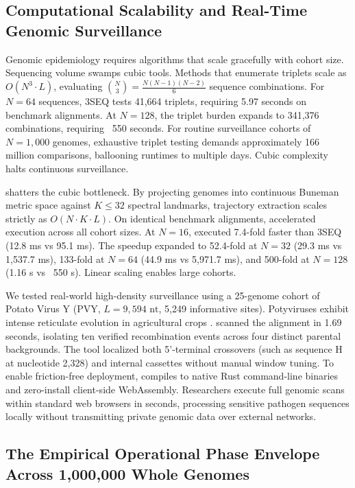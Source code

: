 \subsection{Computational Scalability and Real-Time Genomic Surveillance}
\label{subsec:scalability}

Genomic epidemiology requires algorithms that scale gracefully with cohort size.
Sequencing volume swamps cubic tools.
Methods that enumerate triplets scale as $O(N^3 \cdot L)$, evaluating $\binom{N}{3} = \frac{N(N-1)(N-2)}{6}$ sequence combinations.
For $N=64$ sequences, 3SEQ tests 41,664 triplets, requiring 5.97 seconds on benchmark alignments.
At $N=128$, the triplet burden expands to 341,376 combinations, requiring ~550 seconds.
For routine surveillance cohorts of $N=1,000$ genomes, exhaustive triplet testing demands approximately 166 million comparisons, ballooning runtimes to multiple days.
Cubic complexity halts continuous surveillance.

\RhizAeon shatters the cubic bottleneck.
By projecting genomes into continuous Buneman metric space against $K \le 32$ spectral landmarks, trajectory extraction scales strictly as $O(N \cdot K \cdot L)$.
On identical benchmark alignments, \RhizAeon accelerated execution across all cohort sizes.
At $N=16$, \RhizAeon executed 7.4-fold faster than 3SEQ (12.8 ms vs 95.1 ms).
The speedup expanded to 52.4-fold at $N=32$ (29.3 ms vs 1,537.7 ms), 133-fold at $N=64$ (44.9 ms vs 5,971.7 ms), and 500-fold at $N=128$ (1.16 s vs ~550 s).
Linear scaling enables large cohorts.

We tested real-world high-density surveillance using a 25-genome cohort of Potato Virus Y (PVY, $L = 9,594\text{ nt}$, 5,249 informative sites).
Potyviruses exhibit intense reticulate evolution in agricultural crops \cite{glais2002}.
\RhizAeon scanned the alignment in 1.69 seconds, isolating ten verified recombination events across four distinct parental backgrounds.
The tool localized both 5'-terminal crossovers (such as sequence H at nucleotide 2,328) and internal cassettes without manual window tuning.
To enable friction-free deployment, \RhizAeon compiles to native Rust command-line binaries and zero-install client-side WebAssembly.
Researchers execute full genomic scans within standard web browsers in seconds, processing sensitive pathogen sequences locally without transmitting private genomic data over external networks.

\subsection{The Empirical Operational Phase Envelope Across 1,000,000 Whole Genomes}
\label{subsec:grand_sweep_1m}

